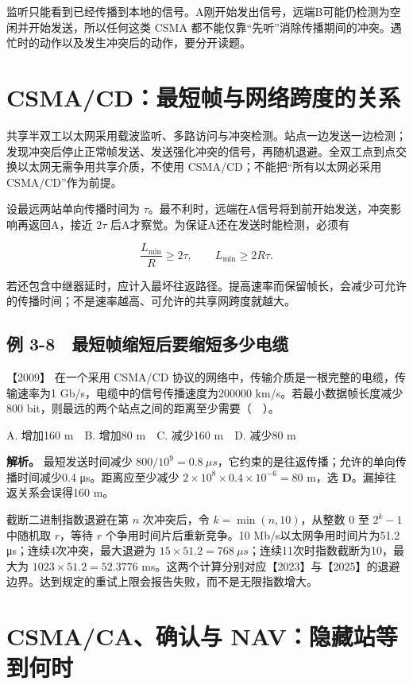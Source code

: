 监听只能看到已经传播到本地的信号。A刚开始发出信号，远端B可能仍检测为空闲并开始发送，所以任何这类 CSMA 都不能仅靠``先听''消除传播期间的冲突。遇忙时的动作以及发生冲突后的动作，要分开读题。

\section{CSMA/CD：最短帧与网络跨度的关系}\label{cn-03-11}

共享半双工以太网采用载波监听、多路访问与冲突检测。站点一边发送一边检测；发现冲突后停止正常帧发送、发送强化冲突的信号，再随机退避。全双工点到点交换以太网无需争用共享介质，不使用 CSMA/CD；不能把``所有以太网必采用 CSMA/CD''作为前提。

设最远两站单向传播时间为 \(\tau\)。最不利时，远端在A信号将到前开始发送，冲突影响再返回A，接近 \(2\tau\) 后A才察觉。为保证A还在发送时能检测，必须有

\[\frac{L_{\min}}R\ge2\tau,\qquad L_{\min}\ge2R\tau.\]

若还包含中继器延时，应计入最坏往返路径。提高速率而保留帧长，会减少可允许的传播时间；不是速率越高、可允许的共享网跨度就越大。

\subsection{例 3-8　最短帧缩短后要缩短多少电缆}\label{cn-ex3-8}

\noindent{}【2009】 在一个采用 CSMA/CD 协议的网络中，传输介质是一根完整的电缆，传输速率为1 Gb/s，电缆中的信号传播速度为200000 km/s。若最小数据帧长度减少800 bit，则最远的两个站点之间的距离至少需要（　）。

A. 增加160 m　B. 增加80 m　C. 减少160 m　D. 减少80 m


\textbf{解析。} 最短发送时间减少 \(800/10^9=0.8\ \mu s\)，它约束的是往返传播；允许的单向传播时间减少0.4 μs。距离应至少减少 \(2\times10^8\times0.4\times10^{-6}=80\) m，选 \textbf{D}。漏掉往返关系会误得160 m。

截断二进制指数退避在第 \(n\) 次冲突后，令 \(k=\min(n,10)\)，从整数 \(0\) 至 \(2^k-1\) 中随机取 \(r\)，等待 \(r\) 个争用时间片后重新竞争。10 Mb/s以太网争用时间片为51.2 μs；连续4次冲突，最大退避为 \(15\times51.2=768\ \mu s\)；连续11次时指数截断为10，最大为 \(1023\times51.2=52.3776\) ms。这两个计算分别对应【2023】与【2025】的退避边界。达到规定的重试上限会报告失败，而不是无限指数增大。

\section{CSMA/CA、确认与 NAV：隐藏站等到何时}\label{cn-03-12}

